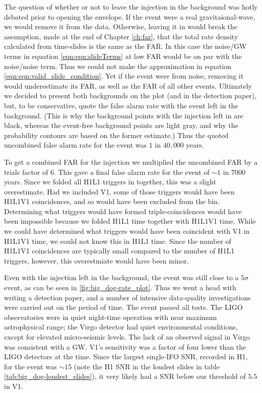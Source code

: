 The question of whether or not to leave the injection in the background was
hotly debated prior to opening the envelope. If the event were a real
gravitaional-wave, we would remove it from the data. Otherwise, leaving it in
would break the assumption, made at the end of Chapter \ref{ch:far}, that the
total rate density calculated from time-slides is the same as the \ac{FAR}. In
this case the noise/GW terms in equation \ref{eqn:eqn:slideTerms} at low
\ac{FAR} would be on par with the noise/noise term. Thus we could not make the
approximation in equation \ref{eqn:eqn:valid_slide_condition}. Yet if the event
were from noise, removing it would underestimate its \ac{FAR}, as well as the
\ac{FAR} of all other events. Ultimately we decided to present both backgrounds
on the plot (and in the detection paper), but, to be conservative, quote the
false alarm rate with the event left in the background. (This is why the
background points with the injection left in are black, whereas the event-free
background points are light gray, and why the probability contours are based on
the former estimate.) Thus the quoted uncombined false alarm rate for the event
was $1$ in $40,000$ years.

To get a combined \ac{FAR} for the injection we multiplied the uncombined
\ac{FAR} by a trials factor of 6. This gave a final false alarm rate for the
event of $\sim1$ in $7000$ years. Since we folded all H1L1 triggers in
together, this was a slight overestimate. Had we included V1, some of those
triggers would have been H1L1V1 coincidences, and so would have been excluded
from the bin. Determining what triggers would have formed triple-coincidences
would have been impossible because we folded H1L1 time together with H1L1V1
time. While we could have determined what triggers would have been coincident
with V1 in H1L1V1 time, we could not know this in H1L1 time. Since the number
of H1L1V1 coincidences are typically small compared to the number of H1L1
triggers, however, this overestmiate would have been minor.

Even with the injection left in the background, the event was still close
to a $5\sigma$ event, as can be seen in \ref{fig:big_dog-rate_plot}. Thus we
went a head with writing a detection paper, and a number of intensive
data-quality investigations were carried out on the period of time. The event
passed all tests.  The LIGO observatories were in quiet night-time operation
with near maximum astrophysical range; the Virgo detector had quiet
environmental conditions, except for elevated micro-seismic levels. The lack of
an observed signal in Virgo was consistent with a \ac{GW}. V1's sensitivity was
a factor of four lower than the LIGO detectors at the time. Since the largest
single-\ac{IFO} \ac{SNR}, recorded in H1, for the event was $\sim15$ (note the
H1 \ac{SNR} in the loudest slides in table \ref{tab:big_dog-loudest_slides}),
it very likely had a \ac{SNR} below our threshold of $5.5$ in V1.

